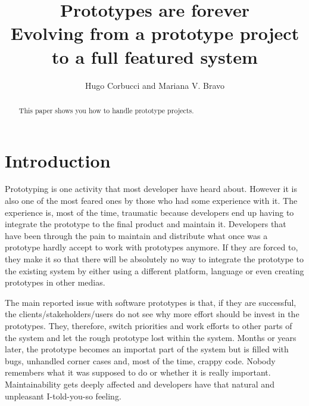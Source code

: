 \documentclass[lnbip]{svmultln}
\begin{document}
%
\mainmatter              %
%
\title{Prototypes are forever\\
  Evolving from a prototype project to a full featured system}
%
%
\author{Hugo Corbucci and Mariana V. Bravo }
%
%
%

\maketitle              %

\begin{abstract}        %
This paper shows you how to handle prototype projects.
\end{abstract}
%
\section{Introduction}

Prototyping is one activity that most developer have heard
about. However it is also one of the most feared ones by those who had
some experience with it. The experience is, most of the time,
traumatic because developers end up having to integrate the prototype
to the final product and maintain it. Developers that have been
through the pain to maintain and distribute what once was a prototype
hardly accept to work with prototypes anymore. If they are forced to,
they make it so that there will be absolutely no way to integrate the
prototype to the existing system by either using a different platform,
language or even creating prototypes in other medias.

The main reported issue with software prototypes is that, if they are
successful, the clients/stakeholders/users do not see why more effort
should be invest in the prototypes. They, therefore, switch priorities
and work efforts to other parts of the system and let the rough
prototype lost within the system. Months or years later, the prototype
becomes an importat part of the system but is filled with bugs,
unhandled corner cases and, most of the time, crappy code. Nobody
remembers what it was supposed to do or whether it is really
important. Maintainability gets deeply affected and developers have
that natural and unpleasant I-told-you-so feeling.
\end{document}
